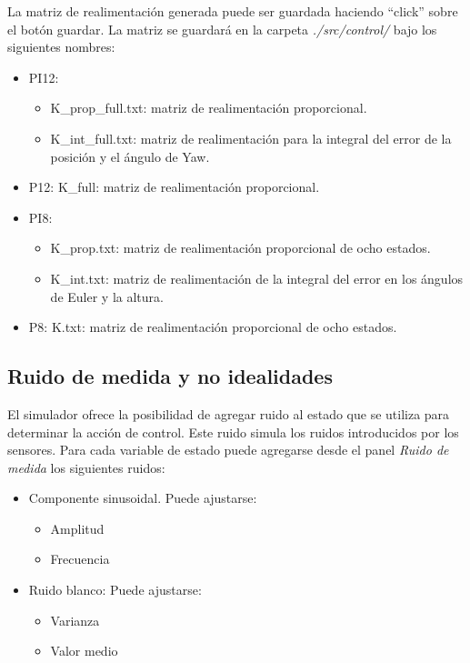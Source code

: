 \documentclass[main]{subfiles}
\begin{document}
La matriz de realimentaci\'on generada puede ser guardada haciendo ``click'' sobre el bot\'on guardar. La matriz se guardar\'a en la carpeta \emph{./src/control/} bajo los siguientes nombres:
\begin{itemize}
\item PI12:
	\begin{itemize}
	\item K\_prop\_full.txt: matriz de realimentaci\'on proporcional.
	\item K\_int\_full.txt: matriz de realimentaci\'on para la integral del error de la posici\'on y el \'angulo de Yaw.
	\end{itemize}
\item P12: K\_full: matriz de realimentaci\'on proporcional.
\item PI8:
	\begin{itemize}
	\item K\_prop.txt: matriz de realimentaci\'on proporcional de ocho estados.
	\item K\_int.txt:  matriz de realimentaci\'on de la integral del error en los \'angulos de Euler y la altura.
	\end{itemize}
\item P8: K.txt: matriz de realimentaci\'on proporcional de ocho estados.
\end{itemize}

\subsection*{Ruido de medida y no idealidades}
El simulador ofrece la posibilidad de agregar ruido al estado que se utiliza para determinar la acci\'on de control. Este ruido simula los ruidos introducidos por los sensores. Para cada variable de estado puede agregarse desde el panel \emph{Ruido de medida} los siguientes ruidos:
\begin{itemize}
\item Componente sinusoidal. Puede ajustarse:
	\begin{itemize}
	\item Amplitud
	\item Frecuencia
	\end{itemize}
\item Ruido blanco: Puede ajustarse:
	\begin{itemize}
	\item Varianza
	\item Valor medio
	\end{itemize}
\end{itemize}
\end{document}
